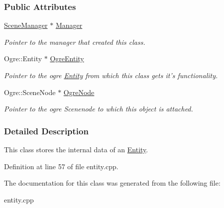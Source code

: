 \subsubsection*{Public Attributes}
\begin{DoxyCompactItemize}
\item 
\hypertarget{structMezzanine_1_1internal_1_1EntityInternalData_a89e83eda19f72d09d266a80021e98f53}{
\hyperlink{classMezzanine_1_1SceneManager}{SceneManager} $\ast$ \hyperlink{structMezzanine_1_1internal_1_1EntityInternalData_a89e83eda19f72d09d266a80021e98f53}{Manager}}
\label{structMezzanine_1_1internal_1_1EntityInternalData_a89e83eda19f72d09d266a80021e98f53}

\begin{DoxyCompactList}\small\item\em Pointer to the manager that created this class. \item\end{DoxyCompactList}\item 
\hypertarget{structMezzanine_1_1internal_1_1EntityInternalData_a5be9d2817d2cb0fc083ad87fee1f5a37}{
Ogre::Entity $\ast$ \hyperlink{structMezzanine_1_1internal_1_1EntityInternalData_a5be9d2817d2cb0fc083ad87fee1f5a37}{OgreEntity}}
\label{structMezzanine_1_1internal_1_1EntityInternalData_a5be9d2817d2cb0fc083ad87fee1f5a37}

\begin{DoxyCompactList}\small\item\em Pointer to the ogre \hyperlink{classMezzanine_1_1Entity}{Entity} from which this class gets it's functionality. \item\end{DoxyCompactList}\item 
\hypertarget{structMezzanine_1_1internal_1_1EntityInternalData_a1806588e73b80a107fa9cd829d15ef23}{
Ogre::SceneNode $\ast$ \hyperlink{structMezzanine_1_1internal_1_1EntityInternalData_a1806588e73b80a107fa9cd829d15ef23}{OgreNode}}
\label{structMezzanine_1_1internal_1_1EntityInternalData_a1806588e73b80a107fa9cd829d15ef23}

\begin{DoxyCompactList}\small\item\em Pointer to the ogre Scenenode to which this object is attached. \item\end{DoxyCompactList}\end{DoxyCompactItemize}


\subsubsection{Detailed Description}
This class stores the internal data of an \hyperlink{classMezzanine_1_1Entity}{Entity}. 

Definition at line 57 of file entity.cpp.



The documentation for this class was generated from the following file:\begin{DoxyCompactItemize}
\item 
entity.cpp\end{DoxyCompactItemize}
